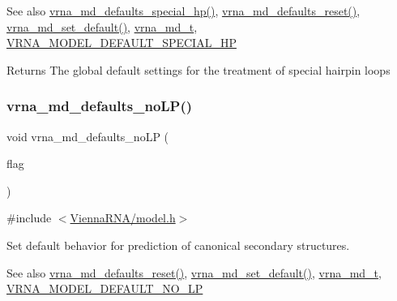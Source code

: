 \begin{DoxySeeAlso}{See also}
\mbox{\hyperlink{group__model__details_gafff6449a02744add0308e653230c15fc}{vrna\+\_\+md\+\_\+defaults\+\_\+special\+\_\+hp()}}, \mbox{\hyperlink{group__model__details_ga70834424cf804d149937de89f80ceb45}{vrna\+\_\+md\+\_\+defaults\+\_\+reset()}}, \mbox{\hyperlink{group__model__details_ga8ac6ff84936282436f822644bf841f66}{vrna\+\_\+md\+\_\+set\+\_\+default()}}, \mbox{\hyperlink{group__model__details_ga1f8a10e12a0a1915f2a4eff0b28ea17c}{vrna\+\_\+md\+\_\+t}}, \mbox{\hyperlink{group__model__details_gabd1ab224e1048defd45c165ed7d1c108}{V\+R\+N\+A\+\_\+\+M\+O\+D\+E\+L\+\_\+\+D\+E\+F\+A\+U\+L\+T\+\_\+\+S\+P\+E\+C\+I\+A\+L\+\_\+\+HP}} 
\end{DoxySeeAlso}
\begin{DoxyReturn}{Returns}
The global default settings for the treatment of special hairpin loops 
\end{DoxyReturn}
\mbox{\label{group__model__details_ga2f88ffc393ac9d7987849c965fd29ea8}} 
\subsubsection{\texorpdfstring{vrna\+\_\+md\+\_\+defaults\+\_\+no\+L\+P()}{vrna\_md\_defaults\_noLP()}}
{\footnotesize\ttfamily void vrna\+\_\+md\+\_\+defaults\+\_\+no\+LP (\begin{DoxyParamCaption}\item[{int}]{flag }\end{DoxyParamCaption})}



{\ttfamily \#include $<$\mbox{\hyperlink{model_8h}{Vienna\+R\+N\+A/model.\+h}}$>$}



Set default behavior for prediction of canonical secondary structures. 

\begin{DoxySeeAlso}{See also}
\mbox{\hyperlink{group__model__details_ga70834424cf804d149937de89f80ceb45}{vrna\+\_\+md\+\_\+defaults\+\_\+reset()}}, \mbox{\hyperlink{group__model__details_ga8ac6ff84936282436f822644bf841f66}{vrna\+\_\+md\+\_\+set\+\_\+default()}}, \mbox{\hyperlink{group__model__details_ga1f8a10e12a0a1915f2a4eff0b28ea17c}{vrna\+\_\+md\+\_\+t}}, \mbox{\hyperlink{group__model__details_gab72462726dd60ed0d43339bbf7ee08ad}{V\+R\+N\+A\+\_\+\+M\+O\+D\+E\+L\+\_\+\+D\+E\+F\+A\+U\+L\+T\+\_\+\+N\+O\+\_\+\+LP}} 
\end{DoxySeeAlso}

